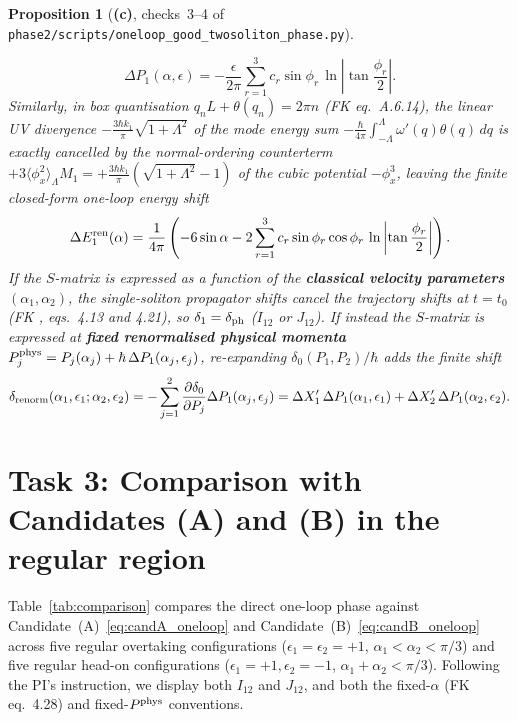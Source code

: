 \documentclass[11pt,a4paper]{article}
\newcommand{\Lc}{\textsf{\textbf{(c)}}}
\newcommand{\script}[1]{\texttt{phase2/\allowbreak scripts/\allowbreak #1}}
\newtheorem{proposition}{Proposition}[section]
\theoremstyle{remark}
\begin{document}
\begin{proposition}[\Lc, checks~3--4 of \script{oneloop\_good\_twosoliton\_phase.py}]
\begin{enumerate}
\begin{equation}\label{eq:Delta_P1}
\boxed{\ \Delta P_1(\alpha,\epsilon)=-\frac{\epsilon}{2\pi}\sum_{r=1}^3 c_r\sin\phi_r\,\ln\left|\tan\frac{\phi_r}{2}\right|.\ }
\end{equation}
Similarly, in box quantisation $q_n L+\theta(q_n)=2\pi n$ (FK eq.~A.6.14), the linear UV divergence $-\frac{3\hbar k_1}{\pi}\sqrt{1+\Lambda^2}$ of the mode energy sum $-\frac{\hbar}{4\pi}\int_{-\Lambda}^\Lambda\omega'(q)\theta(q)\,dq$ is \emph{exactly cancelled} by the normal-ordering counterterm $+3\langle\phi_x^2\rangle_\Lambda M_1=+\frac{3\hbar k_1}{\pi}(\sqrt{1+\Lambda^2}-1)$ of the cubic potential $-\phi_x^3$, leaving the finite closed-form one-loop energy shift
\begin{equation}\label{eq:Delta_E1}
\Delta E_1^{\rm ren}(\alpha)=\frac{1}{4\pi}\left(-6\sin\alpha-2\sum_{r=1}^3 c_r\sin\phi_r\cos\phi_r\,\ln\left|\tan\frac{\phi_r}{2}\right|\right).
\end{equation}
If the $S$-matrix is expressed as a function of the \textbf{classical velocity parameters $(\alpha_1,\alpha_2)$}, the single-soliton propagator shifts cancel the trajectory shifts at $t=t_0$ (FK \cite{FK78}, eqs.~4.13 and 4.21), so $\delta_1=\delta_{\rm ph}$ ($I_{12}$ or $J_{12}$). If instead the $S$-matrix is expressed at \textbf{fixed renormalised physical momenta} $P_j^{\rm phys}=P_j(\alpha_j)+\hbar\,\Delta P_1(\alpha_j,\epsilon_j)$, re-expanding $\delta_0(P_1,P_2)/\hbar$ adds the finite shift
\begin{equation}\label{eq:delta_renorm}
\delta_{\rm renorm}(\alpha_1,\epsilon_1;\alpha_2,\epsilon_2)
=-\sum_{j=1}^2\frac{\partial\delta_0}{\partial P_j}\Delta P_1(\alpha_j,\epsilon_j)
=\Delta X_1'\,\Delta P_1(\alpha_1,\epsilon_1)+\Delta X_2'\,\Delta P_1(\alpha_2,\epsilon_2).
\end{equation}
\end{enumerate}
\end{proposition}

\section{Task 3: Comparison with Candidates (A) and (B) in the regular region}\label{sec:task3}

Table~\ref{tab:comparison} compares the direct one-loop phase against Candidate~(A)~\eqref{eq:candA_oneloop} and Candidate~(B)~\eqref{eq:candB_oneloop} across five regular overtaking configurations ($\epsilon_1=\epsilon_2=+1$, $\alpha_1<\alpha_2<\pi/3$) and five regular head-on configurations ($\epsilon_1=+1,\epsilon_2=-1$, $\alpha_1+\alpha_2<\pi/3$). Following the PI's instruction, we display both $I_{12}$ and $J_{12}$, and both the fixed-$\alpha$ (FK eq.~4.28) and fixed-$P^{\rm phys}$ conventions.
\end{document}
